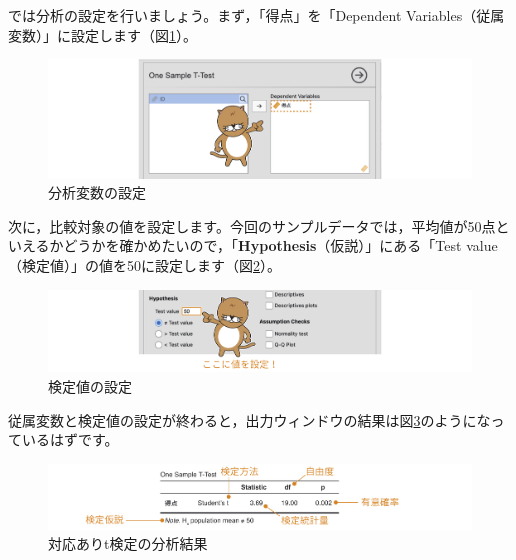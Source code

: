 \documentclass[
  12pt,
  a5jpaper,
  lualatex, ja=standard]{bxjsbook}
\begin{document}
では分析の設定を行いましょう。まず，「得点」を「Dependent Variables（従属変数）」に設定します（図\ref{fig:ttests-one-set-var}）。

\begin{figure}[!ht]

{\centering \includegraphics[width=1\linewidth]{images/ttests/one-set-var} 

}

\caption{分析変数の設定}\label{fig:ttests-one-set-var}
\end{figure}

次に，比較対象の値を設定します。今回のサンプルデータでは，平均値が50点といえるかどうかを確かめたいので，「\textbf{Hypothesis}（仮説）」にある「Test value（検定値）」の値を50に設定します（図\ref{fig:ttests-one-test-value}）。

\begin{figure}[!ht]

{\centering \includegraphics[width=1\linewidth]{images/ttests/one-test-value} 

}

\caption{検定値の設定}\label{fig:ttests-one-test-value}
\end{figure}

従属変数と検定値の設定が終わると，出力ウィンドウの結果は図\ref{fig:ttests-one-results}のようになっているはずです。

\begin{figure}[!ht]

{\centering \includegraphics[width=1\linewidth]{images/ttests/one-results} 

}

\caption{対応ありt検定の分析結果}\label{fig:ttests-one-results}
\end{figure}
\end{document}
